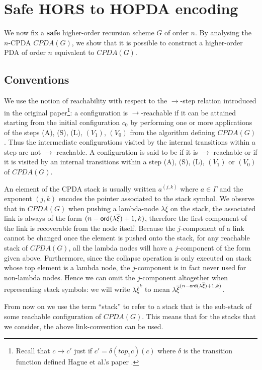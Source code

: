\documentclass[a4paper]{article}
\theoremstyle{remark}
\theoremstyle{definition}
\begin{document}
\section{Safe HORS to HOPDA encoding}

We now fix a {\bf safe} higher-order recursion scheme $G$ of order $n$.
By analysing the $n$-CPDA $CPDA(G)$, we show that it is possible to construct a higher-order PDA of order $n$ equivalent to $CPDA(G)$.


\subsection{Conventions}
We use the notion of reachability with respect to the $\rightarrow$-step relation introduced in the original paper\footnote{Recall that $c\rightarrow c'$
just if $c' = \delta(top_1 c)(c)$ where $\delta$ is the transition
function defined Hague et al.'s paper \cite[Figure 2]{hague-collaps-full}.}: a configuration is $\rightarrow$-reachable if it can be attained starting from the initial configuration $c_0$ by performing one or more applications of the steps (A), (S), (L), $(V_1)$, $(V_0)$ from the algorithm defining $CPDA(G)$.
Thus the intermediate configurations visited by the internal transitions within a step are not $\rightarrow$-reachable.
A configuration is said to be  if it is $\rightarrow$-reachable or if it is visited by an internal transitions
within a step (A), (S), (L), $(V_1)$ or $(V_0)$ of $CPDA(G)$.

An element of the CPDA stack is usually written $a^{(j,k)}$ where $a\in \Gamma$ and the exponent $(j,k)$
encodes the pointer associated to the stack symbol. We observe that in $CPDA(G)$ when pushing a lambda-node $\lambda \overline{\xi}$ on the stack, the associated link is always of the form $(n-{\sf ord}(\lambda \overline{\xi})+1, k)$, therefore the first component of the link is recoverable from the node itself. Because the $j$-component of a link cannot be changed once the element is pushed onto the stack, for any reachable stack of $CPDA(G)$, all the lambda nodes will have a $j$-component of the form given above.
Furthermore, since the collapse operation is only executed on stack whose top element is a lambda node, the $j$-component is in fact never used for non-lambda nodes.
Hence we can omit the $j$-component altogether when representing stack symbols:  we will write $\lambda \overline{\xi}^{k}$ to mean $\lambda \overline{\xi}^{(n-{\sf ord}(\lambda \overline{\xi})+1,k)}$.

From now on we use the term ``stack'' to refer to a stack that is the sub-stack of some reachable configuration of $CPDA(G)$. This means that for the stacks that we consider, the above link-convention
can be used.
\end{document}
